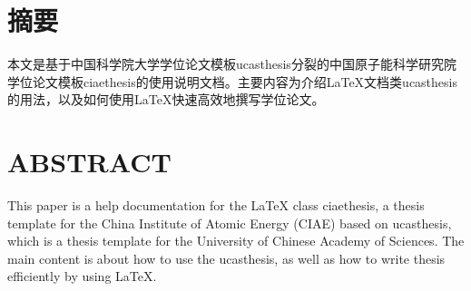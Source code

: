 \maketitle%
\intobmk\chapter*{摘\quad 要}%
\setcounter{page}{1}%

本文是基于中国科学院大学学位论文模板ucasthesis分裂的中国原子能科学研究院学位论文模板ciaethesis的使用说明文档。主要内容为介绍\LaTeX{}文档类ucasthesis的用法，以及如何使用\LaTeX{}快速高效地撰写学位论文。

\intobmk\chapter*{ABSTRACT}%

This paper is a help documentation for the \LaTeX{} class ciaethesis, a thesis template for the China Institute of Atomic Energy (CIAE) based on ucasthesis, which is a thesis template for the University of Chinese Academy of Sciences. The main content is about how to use the ucasthesis, as well as how to write thesis efficiently by using \LaTeX{}.


